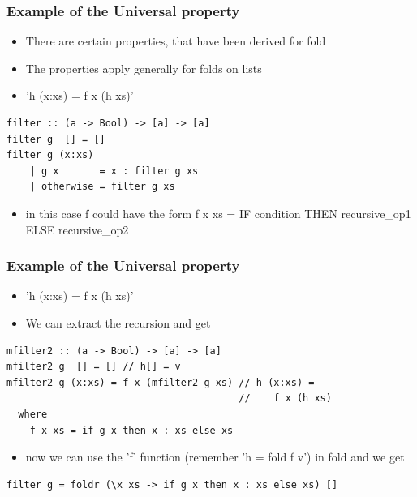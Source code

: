 \documentclass[10pt]{beamer}
\begin{document}
\begin{frame}[fragile]
\frametitle{Example of the Universal property}
\begin{itemize}
\item There are certain properties, that have been derived for fold 
\item The properties apply generally for folds on lists 
\item 'h (x:xs) = f x (h xs)'
\end{itemize}

\begin{lstlisting}
filter :: (a -> Bool) -> [a] -> [a]
filter g  [] = []
filter g (x:xs)  
    | g x       = x : filter g xs 
    | otherwise = filter g xs
\end{lstlisting}

\begin{itemize}
\item in this case f could have the form f x xs = IF condition THEN recursive\_op1 ELSE recursive\_op2 
\end{itemize}

\end{frame}







\begin{frame}[fragile]
\frametitle{Example of the Universal property}
\begin{itemize}
\item 'h (x:xs) = f x (h xs)'
\item We can extract the recursion and get 
\end{itemize}
\begin{lstlisting}
mfilter2 :: (a -> Bool) -> [a] -> [a]
mfilter2 g  [] = [] // h[] = v
mfilter2 g (x:xs) = f x (mfilter2 g xs) // h (x:xs) = 
                                        //    f x (h xs)
  where 
    f x xs = if g x then x : xs else xs 
\end{lstlisting}

\begin{itemize}
\item now we can use the 'f' function (remember 'h = fold f v') in fold and we get
\end{itemize}

\begin{lstlisting}
filter g = foldr (\x xs -> if g x then x : xs else xs) []
\end{lstlisting}

\end{frame}
\end{document}

